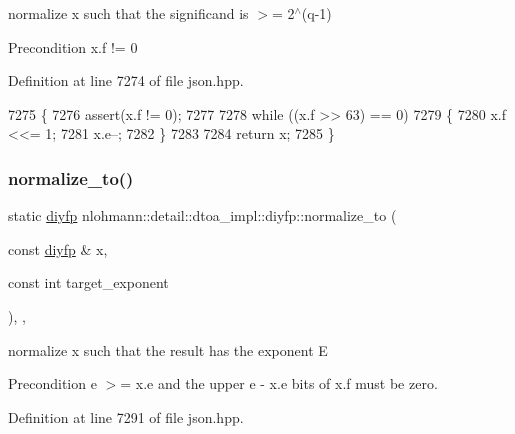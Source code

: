 normalize x such that the significand is $>$= 2$^\wedge$(q-\/1) 

\begin{DoxyPrecond}{Precondition}
x.\+f != 0 
\end{DoxyPrecond}


Definition at line 7274 of file json.\+hpp.


\begin{DoxyCode}
7275     \{
7276         assert(x.f != 0);
7277 
7278         \textcolor{keywordflow}{while} ((x.f >> 63) == 0)
7279         \{
7280             x.f <<= 1;
7281             x.e--;
7282         \}
7283 
7284         \textcolor{keywordflow}{return} x;
7285     \}
\end{DoxyCode}
\mbox{\label{structnlohmann_1_1detail_1_1dtoa__impl_1_1diyfp_a6b6665e467ebabe0c0f7418d3fe4b118}} 
\subsubsection{\texorpdfstring{normalize\+\_\+to()}{normalize\_to()}}
{\footnotesize\ttfamily static \hyperlink{structnlohmann_1_1detail_1_1dtoa__impl_1_1diyfp}{diyfp} nlohmann\+::detail\+::dtoa\+\_\+impl\+::diyfp\+::normalize\+\_\+to (\begin{DoxyParamCaption}\item[{const \hyperlink{structnlohmann_1_1detail_1_1dtoa__impl_1_1diyfp}{diyfp} \&}]{x,  }\item[{const int}]{target\+\_\+exponent }\end{DoxyParamCaption})\hspace{0.3cm}{\ttfamily [inline]}, {\ttfamily [static]}, {\ttfamily [noexcept]}}



normalize x such that the result has the exponent E 

\begin{DoxyPrecond}{Precondition}
e $>$= x.\+e and the upper e -\/ x.\+e bits of x.\+f must be zero. 
\end{DoxyPrecond}


Definition at line 7291 of file json.\+hpp.



